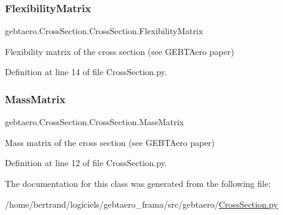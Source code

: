 \subsubsection{\texorpdfstring{Flexibility\+Matrix}{FlexibilityMatrix}}
{\footnotesize\ttfamily gebtaero.\+Cross\+Section.\+Cross\+Section.\+Flexibility\+Matrix}



Flexibility matrix of the cross section (see G\+E\+B\+T\+Aero paper) 



Definition at line 14 of file Cross\+Section.\+py.

\mbox{\label{classgebtaero_1_1_cross_section_1_1_cross_section_ae9be8649853163b2b4dfdaa3584d9f78}} 
\subsubsection{\texorpdfstring{Mass\+Matrix}{MassMatrix}}
{\footnotesize\ttfamily gebtaero.\+Cross\+Section.\+Cross\+Section.\+Mass\+Matrix}



Mass matrix of the cross section (see G\+E\+B\+T\+Aero paper) 



Definition at line 12 of file Cross\+Section.\+py.



The documentation for this class was generated from the following file\+:\begin{DoxyCompactItemize}
\item 
/home/bertrand/logiciels/gebtaero\+\_\+frama/src/gebtaero/\hyperlink{_cross_section_8py}{Cross\+Section.\+py}\end{DoxyCompactItemize}

